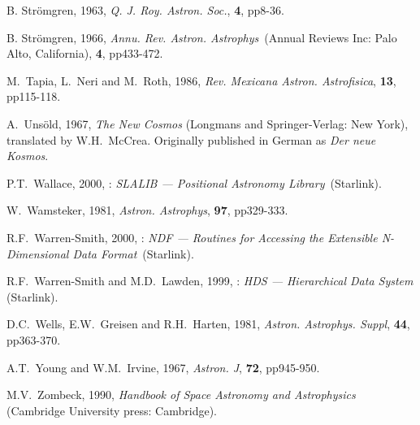 \documentclass[twoside,11pt,nolof]{starlink}
\begin{document}
\begin{thebibliography}{99}
   B. Str\"{o}mgren, 1963, \textit{Q. J. Roy. Astron.
   Soc.}, \textbf{4}, pp8-36.

   B. Str\"{o}mgren, 1966, \textit{Annu. Rev. Astron.
   Astrophys}\, (Annual Reviews Inc: Palo Alto, California), \textbf{4},
   pp433-472.

   M.~Tapia, L.~Neri and M.~Roth, 1986, \textit{Rev.
   Mexicana Astron. Astrofisica}, \textbf{13}, pp115-118.

   A.~Uns\"{o}ld, 1967, \textit{The New Cosmos}
   (Longmans and Springer-Verlag: New York), translated by W.H.~McCrea.
   Originally published in German as \textit{Der neue Kosmos}.

   P.T.~Wallace, 2000, : \textit{SLALIB --- Positional Astronomy Library}\, (Starlink).

   W.~Wamsteker, 1981, \textit{Astron. Astrophys},
   \textbf{97}, pp329-333.

   R.F.~Warren-Smith, 2000, :
   \textit{NDF --- Routines for Accessing the Extensible N-Dimensional Data
   Format}\, (Starlink).

   R.F.~Warren-Smith and M.D.~Lawden, 1999,
   : \textit{HDS --- Hierarchical Data System}\,
   (Starlink).

   D.C.~Wells, E.W.~Greisen and R.H.~Harten, 1981,
   \textit{Astron. Astrophys. Suppl}, \textbf{44}, pp363-370.

   A.T.~Young and W.M.~Irvine, 1967, \textit{Astron.
   J}, \textbf{72}, pp945-950.

   M.V.~Zombeck, 1990, \textit{Handbook of Space
   Astronomy and Astrophysics}\, (Cambridge University press: Cambridge).


\end{thebibliography}


\typeout{  }
\typeout{*****************************************************}
\typeout{  }
\typeout{  }
\typeout{*****************************************************}
\typeout{  }
\end{document}
